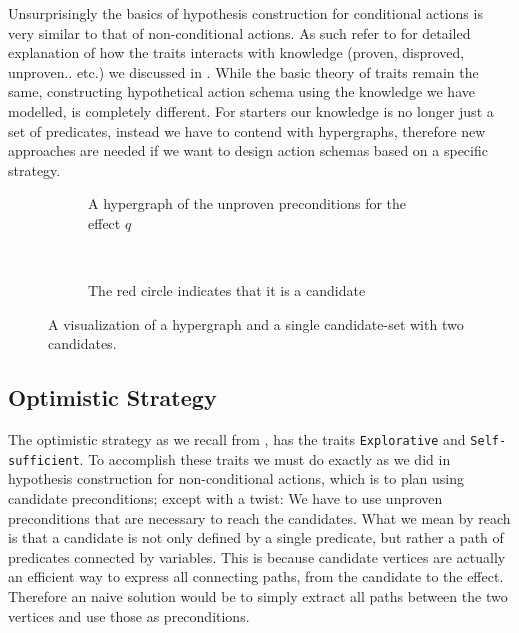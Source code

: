 \documentclass[../Master.tex]{subfiles}
\providecommand{\master}{..}
\begin{document}
Unsurprisingly the basics of hypothesis construction for conditional actions is very similar to that of non-conditional actions. 
As such refer to  for detailed explanation of how the traits interacts with knowledge (proven, disproved, unproven.. etc.) we discussed in .
While the basic theory of traits remain the same, constructing hypothetical action schema using the knowledge we have modelled, is completely different. For starters our knowledge is no longer just a set of predicates, instead we have to contend with hypergraphs, therefore new approaches are needed if we want to design action schemas based on a specific strategy.


\begin{figure}
	\centering
	\begin{subfigure}{.5\textwidth}
		\centering
		  		
		\caption{\label{fig:ca:hypgraph-with-unproven} A hypergraph of the unproven preconditions for the effect $q$}
	\end{subfigure}%
	~ 
	\begin{subfigure}{.5\textwidth}
		\centering
		  
		
		
		
		\caption{\label{fig:ca:hypgraph-with-cands}The red circle indicates that it is a candidate}
	\end{subfigure}
	\caption{ A visualization of a hypergraph and a single candidate-set with two candidates. }
	\label{fig:ca:two-hypgraphs-one-cands}
\end{figure}

\subsection{Optimistic Strategy}
The optimistic strategy as we recall from , has the traits \texttt{Explorative} and \texttt{Self-sufficient}.
To accomplish these traits we must do exactly as we did in hypothesis construction for non-conditional actions, 
which is to plan using candidate preconditions; except with a twist: 
We have to use unproven preconditions that are necessary to reach the candidates.
What we mean by reach is that a candidate is not only defined by a single predicate, but rather a path of predicates connected by variables.
This is because candidate vertices are actually an efficient way to express all connecting paths, from the candidate to the effect.
Therefore an naive solution would be to simply extract all paths between the two vertices and use those as preconditions.
\end{document}
